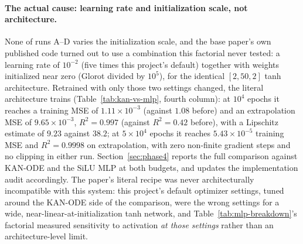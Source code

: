 \paragraph{The actual cause: learning rate and initialization scale, not
architecture.} None of runs A--D varies the initialization scale, and the
base paper's own published code turned out to use a combination this
factorial never tested: a learning rate of $10^{-2}$ (five times this
project's default) together with weights initialized near zero (Glorot
divided by $10^5$), for the identical $[2,50,2]$ tanh architecture. Retrained
with only those two settings changed, the literal architecture trains
(Table~\ref{tab:kan-vs-mlp}, fourth column): at $10^4$ epochs it reaches a
training MSE of $1.11\times10^{-3}$ (against $1.08$ before) and an
extrapolation MSE of $9.65\times10^{-3}$, $R^2=0.997$ (against $R^2=0.42$
before), with a Lipschitz estimate of $9.23$ against $38.2$; at $5\times10^4$
epochs it reaches $5.43\times10^{-5}$ training MSE
and $R^2=0.9998$ on extrapolation, with zero non-finite gradient steps and no
clipping in either run. Section~\ref{sec:phase4} reports the full comparison
against KAN-ODE and the SiLU MLP at both budgets, and updates the
implementation audit accordingly. The paper's literal recipe was never
architecturally incompatible with this system: this project's default
optimizer settings, tuned around the KAN-ODE side of the comparison, were the
wrong settings for a wide, near-linear-at-initialization tanh network, and
Table~\ref{tab:mlp-breakdown}'s factorial measured sensitivity to activation
\emph{at those settings} rather than an architecture-level limit.

\FloatBarrier
